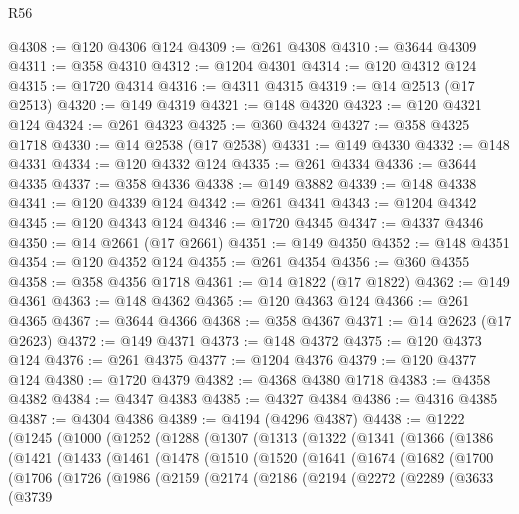 \begin{lexlean}{R56}
\begin{coremodule}
@4308 := @120 @4306 @124
@4309 := @261 @4308
@4310 := @3644 @4309
@4311 := @358 @4310
@4312 := @1204 @4301
@4314 := @120 @4312 @124
@4315 := @1720 @4314
@4316 := @4311 @4315
@4319 := @14 @2513 (@17 @2513)
@4320 := @149 @4319
@4321 := @148 @4320
@4323 := @120 @4321 @124
@4324 := @261 @4323
@4325 := @360 @4324
@4327 := @358 @4325 @1718
@4330 := @14 @2538 (@17 @2538)
@4331 := @149 @4330
@4332 := @148 @4331
@4334 := @120 @4332 @124
@4335 := @261 @4334
@4336 := @3644 @4335
@4337 := @358 @4336
@4338 := @149 @3882
@4339 := @148 @4338
@4341 := @120 @4339 @124
@4342 := @261 @4341
@4343 := @1204 @4342
@4345 := @120 @4343 @124
@4346 := @1720 @4345
@4347 := @4337 @4346
@4350 := @14 @2661 (@17 @2661)
@4351 := @149 @4350
@4352 := @148 @4351
@4354 := @120 @4352 @124
@4355 := @261 @4354
@4356 := @360 @4355
@4358 := @358 @4356 @1718
@4361 := @14 @1822 (@17 @1822)
@4362 := @149 @4361
@4363 := @148 @4362
@4365 := @120 @4363 @124
@4366 := @261 @4365
@4367 := @3644 @4366
@4368 := @358 @4367
@4371 := @14 @2623 (@17 @2623)
@4372 := @149 @4371
@4373 := @148 @4372
@4375 := @120 @4373 @124
@4376 := @261 @4375
@4377 := @1204 @4376
@4379 := @120 @4377 @124
@4380 := @1720 @4379
@4382 := @4368 @4380 @1718
@4383 := @4358 @4382
@4384 := @4347 @4383
@4385 := @4327 @4384
@4386 := @4316 @4385
@4387 := @4304 @4386
@4389 := @4194 (@4296 @4387)
@4438 := @1222
    (@1245
      (@1000
        (@1252
          (@1288
            (@1307
              (@1313
                (@1322
                  (@1341
                    (@1366
                      (@1386
                        (@1421
                          (@1433
                            (@1461
                              (@1478
                                (@1510
                                  (@1520
                                    (@1641
                                      (@1674
                                        (@1682
                                          (@1700
                                            (@1706
                                              (@1726
                                                (@1986
                                                  (@2159
                                                    (@2174
                                                      (@2186
                                                        (@2194
                                                          (@2272
                                                            (@2289
                                                              (@3633
                                                                (@3739

\end{coremodule}
\end{lexlean}
